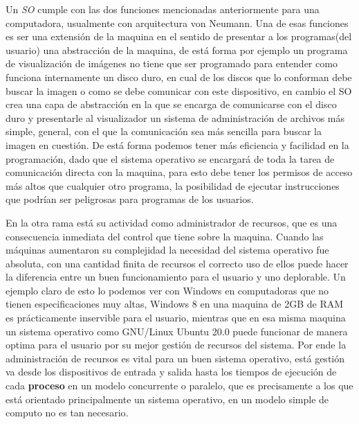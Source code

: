 \documentclass[letterpaper,12pt,oneside]{book}
\begin{document}
		Un \textit{SO} cumple con las dos funciones mencionadas anteriormente para una computadora, usualmente con arquitectura von Neumann. Una
		de esas funciones es ser una extensión de la maquina en el sentido de presentar a los programas(del usuario) una abstracción de la maquina,
		de está forma por ejemplo un programa de visualización de imágenes no tiene que ser programado para entender como funciona internamente un disco 
		duro, en cual de los discos que lo conforman debe buscar la imagen o como se debe comunicar con este dispositivo, en cambio el SO crea
		una capa de abstracción en la que se encarga de comunicarse con el disco duro y presentarle al visualizador un sistema de administración de
		archivos más simple, general, con el que la comunicación sea más sencilla para buscar la imagen en cuestión. De está forma podemos tener más 
		eficiencia y facilidad en la programación, dado que el sistema operativo se encargará de toda la tarea de comunicación directa con la maquina,
		para esto debe tener los permisos de acceso más altos que cualquier otro programa, la posibilidad de ejecutar instrucciones que podrían 
		ser peligrosas para programas de los usuarios\cite{tanenbaum_modern_2002}.
		
		En la otra rama está su actividad como administrador de recursos, que es una consecuencia inmediata del control que tiene sobre la maquina.
		Cuando las máquinas aumentaron su complejidad la necesidad del sistema operativo fue absoluta, con una cantidad finita de recursos el correcto
		uso de ellos puede hacer la diferencia entre un buen funcionamiento para el usuario y uno deplorable. Un ejemplo claro de esto lo podemos ver
		con Windows en computadoras que no tienen especificaciones muy altas, Windows 8 en una maquina de 2GB de RAM es prácticamente inservible para
		el usuario, mientras que en esa misma maquina un sistema operativo como GNU/Linux Ubuntu 20.0 puede funcionar de manera optima para el usuario
		por su mejor gestión de recursos del sistema. Por ende la administración de recursos es vital para un buen sistema operativo, está gestión va
		desde los dispositivos de entrada y salida hasta los tiempos de ejecución de cada \textbf{proceso} en un modelo concurrente o paralelo,
		que es precisamente a los que está orientado principalmente un sistema operativo, en un modelo simple de computo no es tan 
		necesario\cite{tanenbaum_modern_2002}.
		
\end{document}
